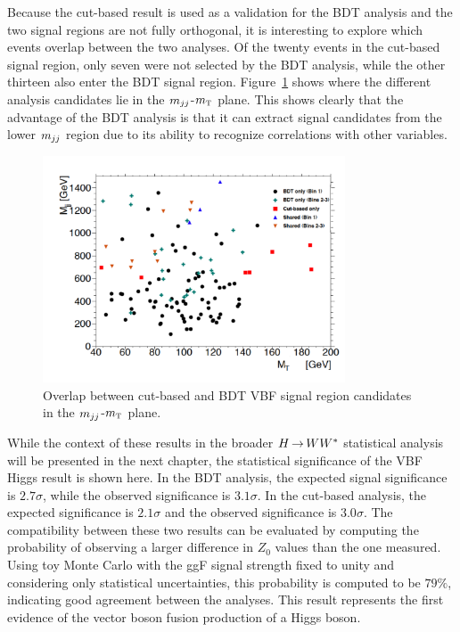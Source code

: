 Because the cut-based result is used as a validation for the BDT analysis and the two signal regions are not fully orthogonal, it is interesting to explore which events overlap between the two analyses. Of the twenty events in the cut-based signal region, only seven were not selected by the BDT analysis, while the other thirteen also enter the BDT signal region. Figure~\ref{fig:vbf_bdt_cb_overlay} shows where the different analysis candidates lie in the $m_{jj}$-$m_{\textrm{\footnotesize\sc t}}$ plane. This shows clearly that the advantage of the BDT analysis is that it can extract signal candidates from the lower $m_{jj}$ region due to its ability to recognize correlations with other variables. 

\begin{figure}[h!]
  \centering
  \captionsetup{justification=centering}
  \includegraphics[width=0.8\textwidth]{figures/OverlapFig}
  \caption{Overlap between cut-based and BDT VBF signal region candidates in the $m_{jj}$-$m_{\textrm{\footnotesize\sc t}}$ plane.}
  \label{fig:vbf_bdt_cb_overlay}
\end{figure}

While the context of these results in the broader $H{\,{\rightarrow}\,}WW^\ast$ statistical analysis will be presented in the next chapter, the statistical significance of the VBF Higgs result is shown here. In the BDT analysis, the expected signal significance is $2.7\sigma$, while the observed significance is $3.1\sigma$. In the cut-based analysis, the expected significance is $2.1\sigma$ and the observed significance is $3.0\sigma$. The compatibility between these two results can be evaluated by computing the probability of observing a larger difference in $Z_0$ values than the one measured. Using toy Monte Carlo with the ggF signal strength fixed to unity and considering only statistical uncertainties, this probability is computed to be $79\%$, indicating good agreement between the analyses. This result represents the first evidence of the vector boson fusion production of a Higgs boson. 
